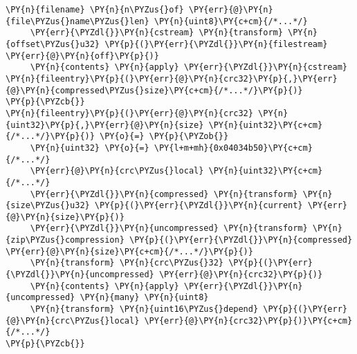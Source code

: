 \begin{Verbatim}[commandchars=\\\{\},codes={\catcode`\$=3\catcode`\^=7\catcode`\_=8}]
     \PY{n}{filename} \PY{n}{n\PYZus{}of} \PY{err}{@}\PY{n}{file\PYZus{}name\PYZus{}len} \PY{n}{uint8}\PY{c+cm}{/*...*/}
     \PY{err}{\PYZdl{}}\PY{n}{cstream} \PY{n}{transform} \PY{n}{offset\PYZus{}u32} \PY{p}{(}\PY{err}{\PYZdl{}}\PY{n}{filestream} \PY{err}{@}\PY{n}{off}\PY{p}{)}
     \PY{n}{contents} \PY{n}{apply} \PY{err}{\PYZdl{}}\PY{n}{cstream} \PY{n}{fileentry}\PY{p}{(}\PY{err}{@}\PY{n}{crc32}\PY{p}{,}\PY{err}{@}\PY{n}{compressed\PYZus{}size}\PY{c+cm}{/*...*/}\PY{p}{)}
\PY{p}{\PYZcb{}}
\PY{n}{fileentry}\PY{p}{(}\PY{err}{@}\PY{n}{crc32} \PY{n}{uint32}\PY{p}{,}\PY{err}{@}\PY{n}{size} \PY{n}{uint32}\PY{c+cm}{/*...*/}\PY{p}{)} \PY{o}{=} \PY{p}{\PYZob{}}
     \PY{n}{uint32} \PY{o}{=} \PY{l+m+mh}{0x04034b50}\PY{c+cm}{/*...*/}
     \PY{err}{@}\PY{n}{crc\PYZus{}local} \PY{n}{uint32}\PY{c+cm}{/*...*/}
     \PY{err}{\PYZdl{}}\PY{n}{compressed} \PY{n}{transform} \PY{n}{size\PYZus{}u32} \PY{p}{(}\PY{err}{\PYZdl{}}\PY{n}{current} \PY{err}{@}\PY{n}{size}\PY{p}{)}
     \PY{err}{\PYZdl{}}\PY{n}{uncompressed} \PY{n}{transform} \PY{n}{zip\PYZus{}compression} \PY{p}{(}\PY{err}{\PYZdl{}}\PY{n}{compressed} \PY{err}{@}\PY{n}{size}\PY{c+cm}{/*...*/}\PY{p}{)}
     \PY{n}{transform} \PY{n}{crc\PYZus{}32} \PY{p}{(}\PY{err}{\PYZdl{}}\PY{n}{uncompressed} \PY{err}{@}\PY{n}{crc32}\PY{p}{)}
     \PY{n}{contents} \PY{n}{apply} \PY{err}{\PYZdl{}}\PY{n}{uncompressed} \PY{n}{many} \PY{n}{uint8}
     \PY{n}{transform} \PY{n}{uint16\PYZus{}depend} \PY{p}{(}\PY{err}{@}\PY{n}{crc\PYZus{}local} \PY{err}{@}\PY{n}{crc32}\PY{p}{)}\PY{c+cm}{/*...*/}
\PY{p}{\PYZcb{}}   
\end{Verbatim}
